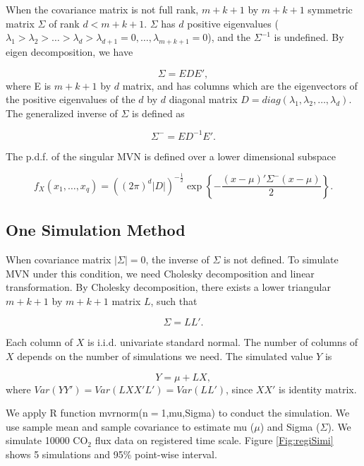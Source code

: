 \documentclass{article}\usepackage[]{graphicx}\usepackage[]{color}
\begin{document}
When the covariance matrix is not full rank, $m+k+1$ by $m+k+1$ symmetric matrix $\Sigma$ of rank $d<m+k+1$. $\Sigma$ has $d$ positive eigenvalues ($\lambda_1>\lambda_2>\dots>\lambda_d>\lambda_{d+1}=0,\dots,\lambda_{m+k+1}=0$), and the $\Sigma^{-1}$ is undefined. By eigen decomposition, we have

\begin{equation}
\Sigma = EDE',
\end{equation}
where E is $m+k+1$ by $d$ matrix, and has columns which are the eigenvectors of the positive eigenvalues of the $d$ by $d$ diagonal matrix $D=diag(\lambda_1,\lambda_2,\dots,\lambda_d)$. The generalized inverse of $\Sigma$ is defined as

\begin{equation}
\Sigma^{-} = ED^{-1}E'.
\end{equation}

The p.d.f. of the singular MVN is defined over a lower dimensional subspace

\begin{equation}
f_{X}(x_1,\dots,x_{q}) = ((2\pi)^d|D|)^{-\frac{1}{2}}\exp\left\{-\frac{(x-\mu)'\Sigma^{-}(x-\mu)}{2}\right\}.
\end{equation}  


\subsection{One Simulation Method}

When covariance matrix $|\Sigma|=0$, the inverse of $\Sigma$ is not defined. To simulate MVN under this condition, we need Cholesky decomposition and linear transformation. By Cholesky decomposition, there exists a lower triangular $m+k+1$ by $m+k+1$ matrix $L$, such that 

\begin{equation}
\Sigma=LL'.
\end{equation}

Each column of $X$ is i.i.d. univariate standard normal. The number of columns of $X$ depends on the number of simulations we need. The simulated value $Y$ is

\begin{equation}
Y = \mu + LX,
\end{equation}  
where $Var(YY')= Var(LXX'L') = Var(LL')$, since $XX'$ is identity matrix. 

We apply R function mvrnorm(n$=$1,mu,Sigma) to conduct the simulation. We use sample mean and sample covariance to estimate mu ($\mu$) and Sigma ($\Sigma$).
We simulate 10000 CO$_2$ flux data on registered time scale. Figure \ref{Fig:regiSimi} shows 5 simulations and 95\% point-wise interval.
\end{document}
